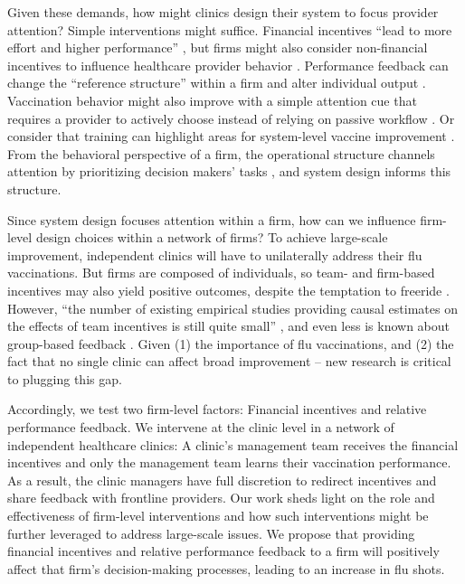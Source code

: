  Given these demands, how might clinics design their system to focus provider attention? Simple interventions might suffice. Financial incentives “lead to more effort and higher performance” \citep[p. 191]{Gneezy2011}, but firms might also consider non-financial incentives to influence healthcare provider behavior \citep{Song2016,Jaeker2019}. Performance feedback can change the “reference structure” within a firm and alter individual output \citep{Roels2014}. Vaccination behavior might also improve with a simple attention cue that requires a provider to actively choose instead of relying on passive workflow \citep{Patel2017}. Or consider that training can highlight areas for system-level vaccine improvement \citep{Gilkey2014}. From the behavioral perspective of a firm, the operational structure channels attention by prioritizing decision makers’ tasks \citep{Simon1947,Hayes1988,Ocasio1997,Ocasio2018}, and system design informs this structure.
 
 Since system design focuses attention within a firm, how can we influence firm-level design choices within a network of firms? To achieve large-scale improvement, independent clinics will have to unilaterally address their flu vaccinations. But firms are composed of individuals, so team- and firm-based incentives may also yield positive outcomes, despite the temptation to freeride \citep{Bandiera2007,Friebel2017}. However, “the number of existing empirical studies providing causal estimates on the effects of team incentives is still quite small” \citep[p. 10]{Delfgaauw2020a}, and even less is known about group-based feedback  \citep[e.g.,][]{Delfgaauw2013}. Given (1) the importance of flu vaccinations, and (2) the fact that no single clinic can affect broad improvement – new research is critical to plugging this gap. 
 
 Accordingly, we test two firm-level factors: Financial incentives and relative performance feedback. We intervene at the clinic level in a network of independent healthcare clinics: A clinic’s management team receives the financial incentives and only the management team learns their vaccination performance. As a result, the clinic managers have full discretion to redirect incentives and share feedback with frontline providers. Our work sheds light on the role and effectiveness of firm-level interventions and how such interventions might be further leveraged to address large-scale issues. We propose that providing financial incentives and relative performance feedback to a firm will positively affect that firm’s decision-making processes, leading to an increase in flu shots.
 
